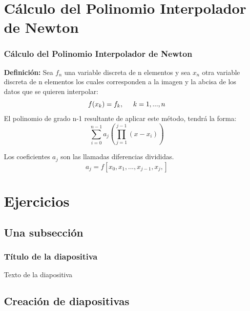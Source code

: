\documentclass{beamer}
\begin{document}
\section{Cálculo del Polinomio Interpolador de Newton}

\begin{frame}

\frametitle{Cálculo del Polinomio Interpolador de Newton}
\textbf{Definición:} Sea $f_{n}$  una variable discreta de n  elementos y sea $x_{n}$ otra variable discreta de n elementos los cuales corresponden a la imagen y la abcisa de los datos que se quieren interpolar:
  \[f(x_{k})=f_{k}, \hspace{0.5 cm} k=1,...,n\]
El polinomio de grado n-1  resultante de aplicar este método, tendrá la forma:
\[\sum_{i=0}^{n-1} {a_j}(\prod_{j=1}^{j-1}{(x-x_{i})})\]
\end{frame}
\begin{frame}
Los coeficientes $a_{j}$ son las llamadas diferencias divididas.
\[ a_{j}=f[x_{0},x_{1},...,x_{j-1},x_{j},]\]
\end{frame}
\section{Ejercicios}

\subsection{Una subsección}
\begin{frame}
\frametitle{Título de la diapositiva}

Texto de la diapositiva
\end{frame}

\subsection{Creación de diapositivas}
\end{document}
